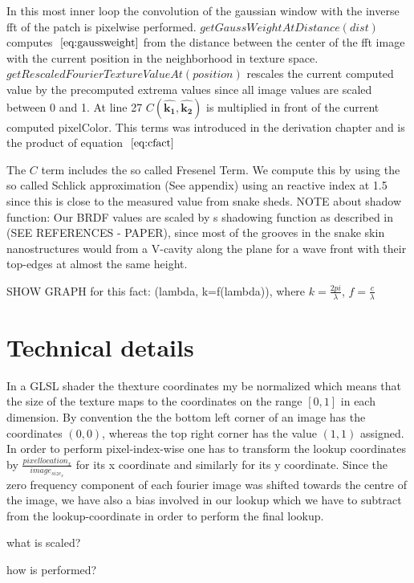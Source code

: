 In this most inner loop the convolution of the gaussian window with the inverse fft of the patch is pixelwise performed. 
$getGaussWeightAtDistance(dist)$ computes $~\eqref{eq:gaussweight}$ from the distance between the center of the fft image with the current position in the neighborhood in texture space. $getRescaledFourierTextureValueAt(position)$ rescales the current computed value by the precomputed extrema values since all image values are scaled between 0 and 1. At line 27 $C(\hat{\mathbf{k_1}},\hat{\mathbf{k_2}})$ is multiplied in front of the current computed pixelColor. This terms was introduced in the derivation chapter and is the product of equation $~\eqref{eq:cfact}$

The $C$ term includes the so called Fresenel Term. We compute this by using the so called Schlick approximation (See appendix) using an reactive index at 1.5 since this is close to the measured value from snake sheds.
NOTE about shadow function:  Our BRDF values are scaled by s shadowing function as described in (SEE REFERENCES - PAPER), since most of the grooves in the snake skin nanostructures would from a V-cavity along the plane for a wave front with their top-edges at almost the same height.   

SHOW GRAPH for this fact: (lambda, k=f(lambda)), where $k = \frac{2pi}{\lambda}$, $f = \frac{c}{\lambda}$


\section{Technical details}
In a GLSL shader the thexture coordinates my be normalized which means that the size of the texture maps to the coordinates on the range $[0,1]$ in each dimension. By convention the the bottom left corner of an image has the coordinates $(0,0)$, whereas the top right corner has the value $(1,1)$ assigned. In order to perform pixel-index-wise one has to transform the lookup coordinates by $\frac{pixellocation_x}{image_{size_x}}$ for its x coordinate and similarly for its y coordinate. Since the zero frequency component of each fourier image was shifted towards the centre of the image, we have also a bias involved in our lookup which we have to subtract from the lookup-coordinate in order to perform the final lookup.

what is scaled?

how is performed?

